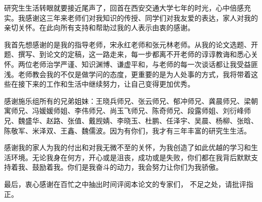 ﻿%
%
%
%
%
%

研究生生活转眼就要接近尾声了，回首在西安交通大学七年的时光，心中倍感充实。我感谢这三年来老师们对我知识的传授、同学们对我友爱的表达，家人对我的亲切关怀。在此向所有支持和帮助过我的人表示由衷的感谢。

我首先想感谢的是我的指导老师，宋永红老师和张元林老师。从我的论文选题、开题、撰写、到论文的定稿，这一路走来，每一步都离不开老师的谆谆教诲和悉心关怀。两位老师治学严谨、知识渊博、谦虚平和，与老师的每一次谈话都让我受益匪浅。老师教会我的不仅是做学问的态度，更重要的是为人处事的方式，我将带着这些在接下来的工作和生活中继续努力，让自己变得更加优秀。

感谢施乐组所有的兄弟姐妹：王晓兵师兄、张云师兄、郁冲师兄、龚晨师兄、梁朝寓师兄、冯媛媛师姐、李伟师兄、尚玉飞师兄、陈奇师兄、段露师姐、刘衍峰师兄、魏盛华、赵路、张值、戴觊婧、李晓玉、杜鹏、任泽宇、吴晨、杨柳、张晗、陈敬军、米泽双、王鑫、魏儒波。因为有你们，我才有三年丰富的研究生生活。

感谢我的家人为我的付出和对我无微不至的关怀，为我创造了如此优越的学习和生活环境。无论我身在何方，开心或是沮丧，成功或是失败，你们都在我背后默默支持着我、鼓励着我。你们是我奋斗的动力，我会努力让你们为我骄傲。

最后，衷心感谢在百忙之中抽出时间评阅本论文的专家们， 不足之处，请批评指正。
